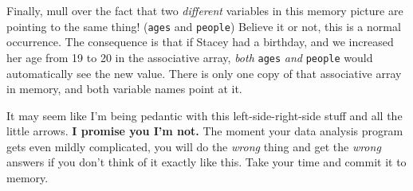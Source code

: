 Finally, mull over the fact that two \textit{different} variables in this
memory picture are pointing to the same thing! (\texttt{ages} and
\texttt{people}) Believe it or not, this is a normal occurrence. The
consequence is that if Stacey had a birthday, and we increased her age from 19
to 20 in the associative array, \textit{both} \texttt{ages} \textit{and}
\texttt{people} would automatically see the new value. There is only one copy
of that associative array in memory, and both variable names point at it.

It may seem like I'm being pedantic with this left-side-right-side stuff and
all the little arrows. \textbf{I promise you I'm not.} The moment your data
analysis program gets even mildly complicated, you will do the \textit{wrong}
thing and get the \textit{wrong} answers if you don't think of it exactly like
this. Take your time and commit it to memory.
